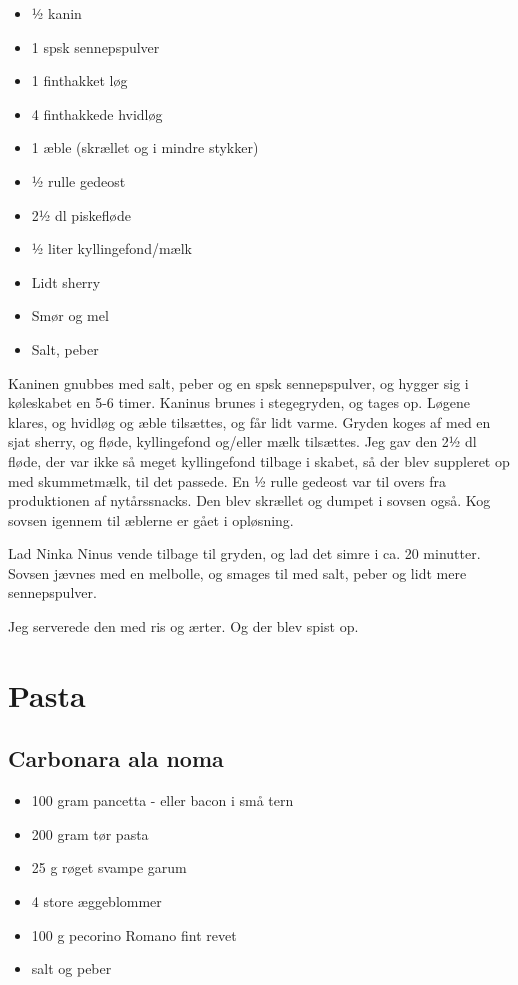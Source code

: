 \documentclass[
]{book}
\providecommand{\tightlist}{%
  \setlength{\itemsep}{0pt}\setlength{\parskip}{0pt}}
\begin{document}
\begin{itemize}
\tightlist
\item
  ½ kanin
\item
  1 spsk sennepspulver
\item
  1 finthakket løg
\item
  4 finthakkede hvidløg
\item
  1 æble (skrællet og i mindre stykker)
\item
  ½ rulle gedeost
\item
  2½ dl piskefløde
\item
  ½ liter kyllingefond/mælk
\item
  Lidt sherry
\item
  Smør og mel
\item
  Salt, peber
\end{itemize}

Kaninen gnubbes med salt, peber og en spsk sennepspulver, og hygger sig i køleskabet en 5-6 timer.
Kaninus brunes i stegegryden, og tages op.
Løgene klares, og hvidløg og æble tilsættes, og får lidt varme.
Gryden koges af med en sjat sherry, og fløde, kyllingefond og/eller mælk tilsættes.
Jeg gav den 2½ dl fløde, der var ikke så meget kyllingefond tilbage i skabet, så der blev suppleret op med skummetmælk, til det passede.
En ½ rulle gedeost var til overs fra produktionen af nytårssnacks. Den blev skrællet og dumpet i sovsen også. Kog sovsen igennem til æblerne er gået i opløsning.

Lad Ninka Ninus vende tilbage til gryden, og lad det simre i ca. 20 minutter.
Sovsen jævnes med en melbolle, og smages til med salt, peber og lidt mere sennepspulver.

Jeg serverede den med ris og ærter. Og der blev spist op.

\hypertarget{pasta}{%
\chapter{Pasta}\label{pasta}}

\hypertarget{carbonara-ala-noma}{%
\section{Carbonara ala noma}\label{carbonara-ala-noma}}

\begin{itemize}
\tightlist
\item
  100 gram pancetta - eller bacon i små tern
\item
  200 gram tør pasta
\item
  25 g røget svampe garum
\item
  4 store æggeblommer
\item
  100 g pecorino Romano fint revet
\item
  salt og peber
\end{itemize}
\end{document}
